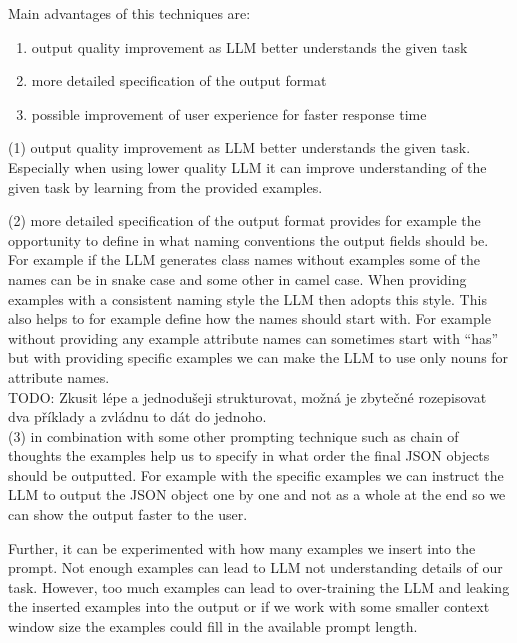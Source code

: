 Main advantages of this techniques are:

\begin{enumerate}
\item output quality improvement as LLM better understands the given task
\item more detailed specification of the output format
\item possible improvement of user experience for faster response time
\end{enumerate}

(1) output quality improvement as LLM better understands the given task. Especially when using lower quality LLM it can improve understanding of the given task by learning from the provided examples.

(2) more detailed specification of the output format provides for example the opportunity to define in what naming conventions the output fields should be. For example if the LLM generates class names without examples some of the names can be in snake case and some other in camel case. When providing examples with a consistent naming style the LLM then adopts this style. This also helps to for example define how the names should start with. For example without providing any example attribute names can sometimes start with ``has'' but with providing specific examples we can make the LLM to use only nouns for attribute names. \\

TODO: Zkusit lépe a jednodušeji strukturovat, možná je zbytečné rozepisovat dva příklady a zvládnu to dát do jednoho. \\

(3) in combination with some other prompting technique such as chain of thoughts the examples help us to specify in what order the final JSON objects should be outputted. For example with the specific examples we can instruct the LLM to output the JSON object one by one and not as a whole at the end so we can show the output faster to the user.

Further, it can be experimented with how many examples we insert into the prompt. Not enough examples can lead to LLM not understanding details of our task. However, too much examples can lead to over-training the LLM and leaking the inserted examples into the output or if we work with some smaller context window size the examples could fill in the available prompt length.